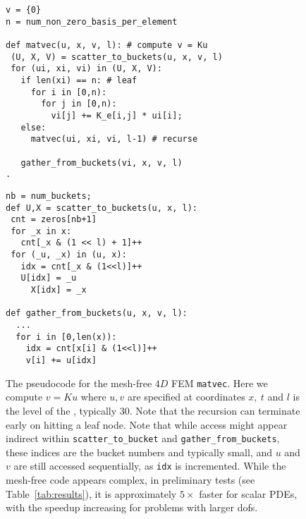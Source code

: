 \begin{figure}
	\begin{minipage}{0.55\textwidth}
	 \begin{verbatim}
v = {0} 
n = num_non_zero_basis_per_element		

def matvec(u, x, v, l): # compute v = Ku 
 (U, X, V) = scatter_to_buckets(u, x, v, l)
 for (ui, xi, vi) in (U, X, V):
   if len(xi) == n: # leaf
     for i in [0,n):
       for j in [0,n):
         vi[j] += K_e[i,j] * ui[i];
   else:
     matvec(ui, xi, vi, l-1) # recurse

   gather_from_buckets(vi, x, v, l) 
.
	\end{verbatim}
 \end{minipage}
	\begin{minipage}{0.45\textwidth}
		\begin{verbatim}
nb = num_buckets;
def U,X = scatter_to_buckets(u, x, l):
 cnt = zeros[nb+1] 
 for _x in x: 
   cnt[_x & (1 << l) + 1]++  
 for (_u, _x) in (u, x):  
   idx = cnt[_x & (1<<l)]++
   U[idx] = _u  
	 X[idx] = _x

def gather_from_buckets(u, x, v, l):
  ... 
  for i in [0,len(x)):  
    idx = cnt[x[i] & (1<<l)]++
    v[i] += u[idx]    
		\end{verbatim}	
	\end{minipage}
	\caption{\label{fig:matvec} \small The pseudocode for the mesh-free $4D$ FEM \texttt{matvec}. Here we compute $v = Ku$ where $u,v$ are specified at coordinates $x,~t$ and $l$ is the level of the \stri, typically $30$. Note that the recursion can terminate early on hitting a leaf node. 
	Note that while access might appear indirect within \texttt{scatter\_to\_bucket} and \texttt{gather\_from\_buckets}, these indices are the bucket numbers and typically small, and $u$ and $v$ are still accessed sequentially, as \texttt{idx} is incremented. 
	While the mesh-free code appears complex, in preliminary tests (see Table~\ref{tab:results}), 
	it is approximately $5\times$ faster for scalar PDEs, with the speedup 
	increasing for problems with larger dofs.
	}
\end{figure}

